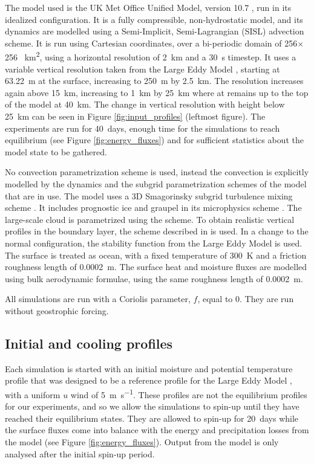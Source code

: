 \documentclass[11pt,a4paper]{article}
\begin{document}
The model used is the UK Met Office Unified Model, version 10.7 \parencite{walters2017met}, run in its idealized configuration. It is a fully compressible, non-hydrostatic model, and its dynamics are modelled using a Semi-Implicit, Semi-Lagrangian (SISL) advection scheme. It is run using Cartesian coordinates, over a bi-periodic domain of 256$\times$256 \SI{}{km^2}, using a horizontal resolution of \SI{2}{km} and a \SI{30}{s} timestep. It uses a variable vertical resolution taken from the Large Eddy Model \parencite{petch2001sensitivity}, starting at \SI{63.22}{m} at the surface, increasing to \SI{250}{m} by \SI{2.5}{km}. The resolution increases again above \SI{15}{km}, increasing to \SI{1}{km} by \SI{25}{km} where at remains up to the top of the model at \SI{40}{km}. The change in vertical resolution with height below \SI{25}{km} can be seen in Figure \ref{fig:input_profiles} (leftmost figure).
The experiments are run for \SI{40}{days}, enough time for the simulations to reach equilibrium (see Figure \ref{fig:energy_fluxes}) and for sufficient statistics about the model state to be gathered. 

No convection parametrization scheme is used, instead the convection is explicitly modelled by the dynamics and the subgrid parametrization schemes of the model that are in use. The model uses a 3D Smagorinsky subgrid turbulence mixing scheme \parencite{todocite}. It includes prognostic ice and graupel in its microphysics scheme \parencite{todocite}. The large-scale cloud is parametrized using the \cite{smith1990scheme} scheme. To obtain realistic vertical profiles in the boundary layer, the scheme described in \cite{lock2000new} is used. In a change to the normal configuration, the stability function from the Large Eddy Model \parencite{petch2001sensitivity} is used. The surface is treated as ocean, with a fixed temperature of \SI{300}{K} and a friction roughness length of \SI{0.0002}{m}. The surface heat and moisture fluxes are modelled using bulk aerodynamic formulae, using the same roughness length of \SI{0.0002}{m}.

All simulations are run with a Coriolis parameter, $f$, equal to 0. They are run without geostrophic forcing.

\subsection{Initial and cooling profiles}

Each simulation is started with an initial moisture and potential temperature profile that was designed to be a reference profile for the Large Eddy Model \parencite{petch2001sensitivity}, with a uniform $u$ wind of \SI{5}{m.s^{-1}}. These profiles are not the equilibrium profiles for our experiments, and so we allow the simulations to spin-up until they have reached their equilibrium states. They are allowed to spin-up for \SI{20}{days} while the surface fluxes come into balance with the energy and precipitation losses from the model (see Figure \ref{fig:energy_fluxes}). Output from the model is only analysed after the initial spin-up period.
\end{document}
